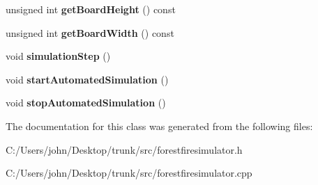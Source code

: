 \begin{DoxyCompactItemize}
\item 
unsigned int {\bfseries get\+Board\+Height} () const \hypertarget{class_forest_fire_simulator_aab07c284bc05af4602d7a7955bffd9fa}{}\label{class_forest_fire_simulator_aab07c284bc05af4602d7a7955bffd9fa}

\item 
unsigned int {\bfseries get\+Board\+Width} () const \hypertarget{class_forest_fire_simulator_a3f7eb638224b52e03f521a14c146838d}{}\label{class_forest_fire_simulator_a3f7eb638224b52e03f521a14c146838d}

\item 
void {\bfseries simulation\+Step} ()\hypertarget{class_forest_fire_simulator_ad42e3ebcd8d970c1798d089b1da1f803}{}\label{class_forest_fire_simulator_ad42e3ebcd8d970c1798d089b1da1f803}

\item 
void {\bfseries start\+Automated\+Simulation} ()\hypertarget{class_forest_fire_simulator_abfdcdcab2a2092f7af749abff6883c59}{}\label{class_forest_fire_simulator_abfdcdcab2a2092f7af749abff6883c59}

\item 
void {\bfseries stop\+Automated\+Simulation} ()\hypertarget{class_forest_fire_simulator_a296707f2f0ac431534ddbc4c2f790f3f}{}\label{class_forest_fire_simulator_a296707f2f0ac431534ddbc4c2f790f3f}

\end{DoxyCompactItemize}


The documentation for this class was generated from the following files\+:\begin{DoxyCompactItemize}
\item 
C\+:/\+Users/john/\+Desktop/trunk/src/forestfiresimulator.\+h\item 
C\+:/\+Users/john/\+Desktop/trunk/src/forestfiresimulator.\+cpp\end{DoxyCompactItemize}
